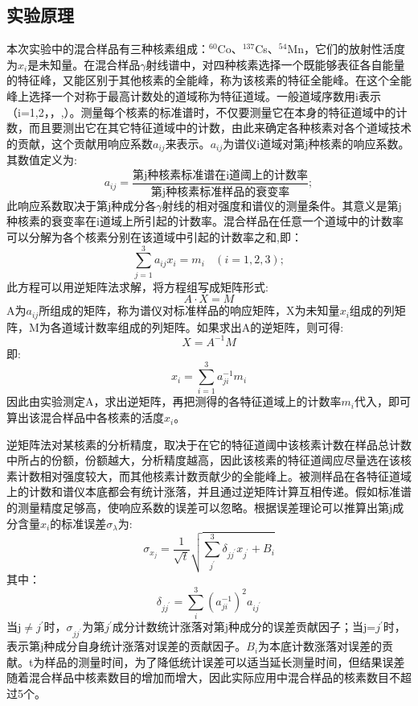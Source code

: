 \documentclass[a4paper,10.0pt,twoside]{npr}
\begin{document}
\begin{multicols}{2}
\section{实验原理}
本次实验中的混合样品有三种核素组成：$^{60}$Co、$^{137}$Cs、$^{54}$Mn，它们的放射性活度为$x_{i}$是未知量。在混合样品$\gamma$射线谱中，对四种核素选择一个既能够表征各自能量的特征峰，又能区别于其他核素的全能峰，称为该核素的特征全能峰。在这个全能峰上选择一个对称于最高计数处的道域称为特征道域。一般道域序数用i表示（i=1,2，，,）。测量每个核素的标准谱时，不仅要测量它在本身的特征道域中的计数，而且要测出它在其它特征道域中的计数，由此来确定各种核素对各个道域技术的贡献，这个贡献用响应系数$a_{ij}$来表示。$a_{ij}$为谱仪i道域对第j种核素的响应系数。其数值定义为:\\
\begin{equation}
a_{ij}=\frac{\text{第j种核素标准谱在i道阈上的计数率}}{\text{第j种核素标准样品的衰变率}};
\end{equation}
此响应系数取决于第j种成分各$\gamma$射线的相对强度和谱仪的测量条件。其意义是第j种核素的衰变率在i道域上所引起的计数率。混合样品在任意一个道域中的计数率可以分解为各个核素分别在该道域中引起的计数率之和,即：
\begin{equation}
\sum_{j=1}^{3}a_{ij}x_{i}=m_{i}    ~~~~(i=1,2,3);
\end{equation}
此方程可以用逆矩阵法求解，将方程组写成矩阵形式:
\begin{equation}
A \cdot X=M
\end{equation}
A为$a_{ij}$所组成的矩阵，称为谱仪对标准样品的响应矩阵，X为未知量$x_{i}$组成的列矩阵，M为各道域计数率组成的列矩阵。如果求出A的逆矩阵，则可得:
\begin{equation}
X=A^{-1}M
\end{equation}
即:
\begin{equation}
x_{i}=\sum_{i=1}^{3}a_{ji}^{-1}m_{i}
\end{equation}
因此由实验测定A，求出逆矩阵，再把测得的各特征道域上的计数率$m_{i}$代入，即可算出该混合样品中各核素的活度$x_{i}$。

逆矩阵法对某核素的分析精度，取决于在它的特征道阈中该核素计数在样品总计数中所占的份额，份额越大，分析精度越高，因此该核素的特征道阈应尽量选在该核素计数相对强度较大，而其他核素计数贡献少的全能峰上。被测样品在各特征道域上的计数和谱仪本底都会有统计涨落，并且通过逆矩阵计算互相传递。假如标准谱的测量精度足够高，使响应系数的误差可以忽略。根据误差理论可以推算出第j成分含量$x_{i}$的标准误差$\sigma _{\lambda }$为:
\begin{equation}
\sigma _{x_{j} }=\frac{1}{\sqrt{t}}\sqrt{\sum_{j^{'}}^{3}\delta _{jj^{'}}x_{j^{'}}+B_{i}}
\end{equation}
其中：
\begin{equation}
\delta _{jj^{'}}=\sum_{i}^{3}(a_{ji}^{-1})^{2}a_{ij^{'}}
\end{equation}
当j$\neq $$j^{'}$时，$\sigma  _{jj^{'}}$为第$j^{'}$成分计数统计涨落对第j种成分的误差贡献因子；当j=$j^{'}$时，表示第j种成分自身统计涨落对误差的贡献因子。$B_{i}$为本底计数涨落对误差的贡献。t为样品的测量时间，为了降低统计误差可以适当延长测量时间，但结果误差随着混合样品中核素数目的增加而增大，因此实际应用中混合样品的核素数目不超过5个。

\end{multicols}
\end{document}
